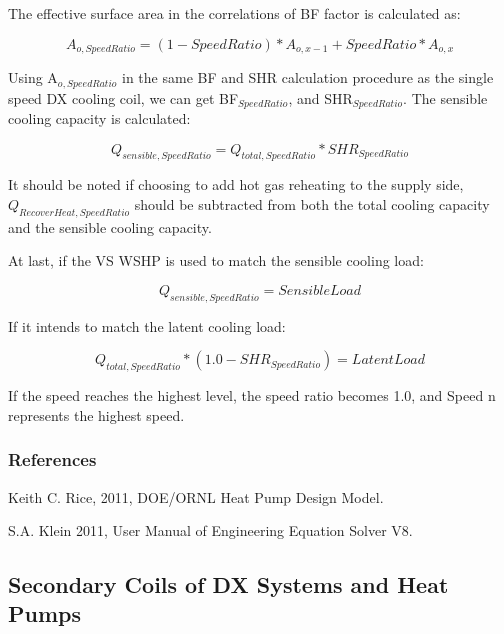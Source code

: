 The effective surface area in the correlations of BF factor is calculated as:

\begin{equation}
{A_{o,SpeedRatio}} = \left( {1 - SpeedRatio} \right)*{A_{o,x - 1}} + SpeedRatio*{A_{o,x}}
\end{equation}

Using A\(_{o,SpeedRatio}\) in the same BF and SHR calculation procedure as the single speed DX cooling coil, we can get BF\(_{SpeedRatio}\), and SHR\(_{SpeedRatio}\).  The sensible cooling capacity is calculated:

\begin{equation}
{Q_{sensible,SpeedRatio}} = {Q_{total,SpeedRatio}}*SH{R_{SpeedRatio}}
\end{equation}

It should be noted if choosing to add hot gas reheating to the supply side, \({Q_{RecoverHeat,SpeedRatio}}\) should be subtracted from both the total cooling capacity and the sensible cooling capacity.

At last, if the VS WSHP is used to match the sensible cooling load:

\begin{equation}
{Q_{sensible,SpeedRatio}} = SensibleLoad
\end{equation}

If it intends to match the latent cooling load:

\begin{equation}
{Q_{total,SpeedRatio}}*\left( {1.0 - SH{R_{SpeedRatio}}} \right) = LatentLoad
\end{equation}

If the speed reaches the highest level, the speed ratio becomes 1.0, and Speed n represents the highest speed.

\subsubsection{References}\label{references-9}

Keith C. Rice, 2011, DOE/ORNL Heat Pump Design Model.

S.A. Klein 2011, User Manual of Engineering Equation Solver V8.

\subsection{Secondary Coils of DX Systems and Heat Pumps}\label{secondary-coils-of-dx-systems-and-heat-pumps}

